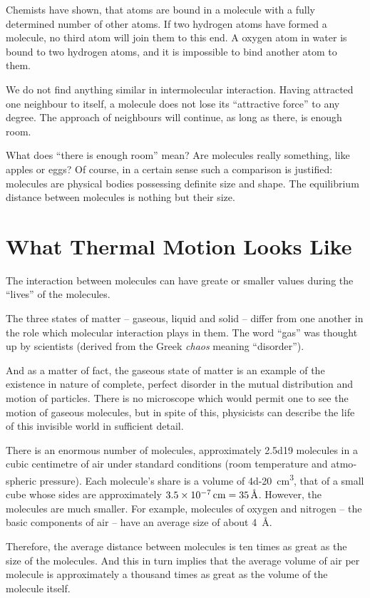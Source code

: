 Chemists have shown, that atoms are bound in a mole­cule with a fully determined number of other atoms. If two hydrogen atoms have formed a molecule, no third atom will join them to this end. A oxygen atom in water is bound to two hydrogen atoms, and it is im­possible to bind another atom to them.

We do not find anything similar in intermolecular interaction. Having attracted one neighbour to itself, a molecule does not lose its ``attractive force'' to any degree. The approach of neighbours will continue, as long as there, is enough room.

What does ``there is enough room'' mean? Are molecules really something, like apples or eggs? Of course, in a certain sense such a comparison is justified: molecules are physical bodies possessing definite size and shape. The equilibrium distance between molecules is nothing but their size.


\section{What Thermal Motion Looks Like}
The interaction between molecules can have greate or smaller values during the ``lives'' of the molecules.

The three states of matter -- gaseous, liquid and solid -- differ from one another in the role which molecular interaction plays in them. The word ``gas'' was thought up by scientists (derived from the Greek \emph{chaos} meaning ``disorder'').

And as a matter of fact, the gaseous state of matter is an example of the existence in nature of complete, perfect disorder in the mutual distribution and motion of particles. There is no microscope which would permit one to see the motion of gaseous molecules, but in spite of this, physicists can describe the life of this invisible world in sufficient detail.

There is an enormous number of molecules, approximate­ly \num{2.5d19} molecules in a cubic centimetre of air under standard conditions (room temperature and atmo­spheric pressure). Each molecule’s share is a volume of \SI{4d-20}{\centi\meter\cubed}, that of a small cube whose sides are approximately $\SI{3.5d-7}{\centi\meter} = \SI{35}{\angstrom}$. However, the molecules are much smaller. For example, molecules of oxygen and nitrogen -- the basic components of air -- have an average size of about \SI{4}{\angstrom}.

Therefore, the average distance between molecules is ten times as great as the size of the molecules. And this in turn implies that the average volume of air per molecule is approximately a thousand times as great as the volume of the molecule itself.

